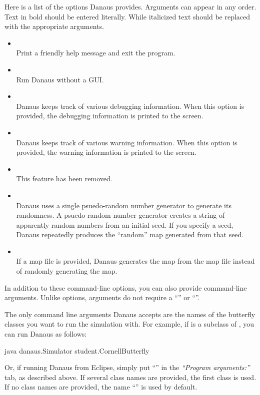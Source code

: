 \documentclass{pset}
\newcommand{\removed}{This feature has been removed.}
\begin{document}
Here is a list of the options Danaus provides. Arguments can appear in any
order. Text in bold should be entered literally. While italicized text should
be replaced with the appropriate arguments.
\begin{itemize}
    \item \emph{}\\
        Print a friendly help message and exit the program. 

    \item \emph{}\\
        Run Danaus without a GUI.

    \item \emph{}\\
        Danaus keeps track of various debugging information. When this option
        is provided, the debugging information is printed to the screen.

    \item \emph{}\\
        Danaus keeps track of various warning information. When this option is
        provided, the warning information is printed to the screen.

    \item \emph{}\\
        \removed{}

    \item \emph{}\\
        Danaus uses a single psuedo-random number generator to generate its
        randomness. A psuedo-random number generator creates a string of
        apparently random numbers from an initial seed. If you specify a seed,
        Danaus repeatedly produces the ``random'' map generated from that seed. 

    \item \emph{}\\
        If a map file is provided, Danaus generates the map from the map file
        instead of randomly generating the map.
\end{itemize}

In addition to these command-line options, you can also provide command-line
arguments.
Unlike options, arguments do not require a ``\java{-}'' or ``\java{--}''.

The only command line arguments Danaus accepts are the names of the butterfly
classes you want to run the simulation with. For example, if
 is a subclass of , you can run
Danaus as follows:
\begin{Java}
  java danaus.Simulator student.CornellButterfly
\end{Java}
Or, if  running Danaus from Eclipse, simply put ``'' in
the \emph{``Program arguments:''} tab, as described above. If several class
names are provided, the first class is used. If no class names are provided,
the name ``'' is used by default.
\end{document}
